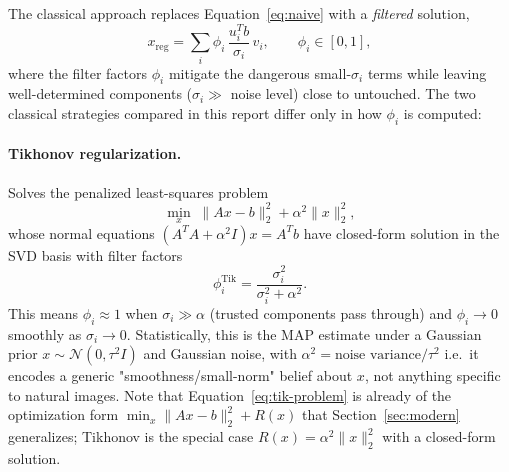 \documentclass[12pt, a4paper, onecolumn]{article}
\theoremstyle{plain}          %
\theoremstyle{definition}     %
\theoremstyle{remark}
\begin{document}
The classical approach replaces Equation~\eqref{eq:naive} with a \emph{filtered} solution,
\begin{equation}
    x_{\text{reg}} = \sum_i \phi_i\,\frac{u_i^Tb}{\sigma_i}\,v_i,
    \qquad \phi_i\in[0,1],
    \label{eq:filtered}
\end{equation}
where the filter factors $\phi_i$ mitigate the dangerous small-$\sigma_i$ terms while leaving well-determined components ($\sigma_i\gg$ noise level)
close to untouched. The two classical strategies compared in this report differ only in how $\phi_i$ is computed:

\paragraph{Tikhonov regularization.} Solves the penalized least-squares problem
\begin{equation}
    \min_x\; \|Ax-b\|_2^2 + \alpha^2\|x\|_2^2,
    \label{eq:tik-problem}
\end{equation}
whose normal equations $(A^TA+\alpha^2I)x=A^Tb$ have closed-form solution in the SVD basis with filter factors
\begin{equation}
    \phi_i^{\text{Tik}} = \frac{\sigma_i^2}{\sigma_i^2+\alpha^2}.
    \label{eq:tik-filter}
\end{equation}
This means $\phi_i\approx1$ when $\sigma_i\gg\alpha$
(trusted components pass through) and $\phi_i\to0$ smoothly as
$\sigma_i\to0$. Statistically, this is the MAP estimate under a Gaussian
prior $x\sim\mathcal N(0,\tau^2I)$ and Gaussian noise, with
$\alpha^2=\text{noise variance}/\tau^2$ i.e.\ it encodes a generic
"smoothness/small-norm" belief about $x$, not anything specific to natural
images. Note that Equation~\eqref{eq:tik-problem} is already of the
optimization form $\min_x\|Ax-b\|_2^2+R(x)$ that Section~\ref{sec:modern}
generalizes; Tikhonov is the special case $R(x)=\alpha^2\|x\|_2^2$ with a closed-form solution.
\end{document}
